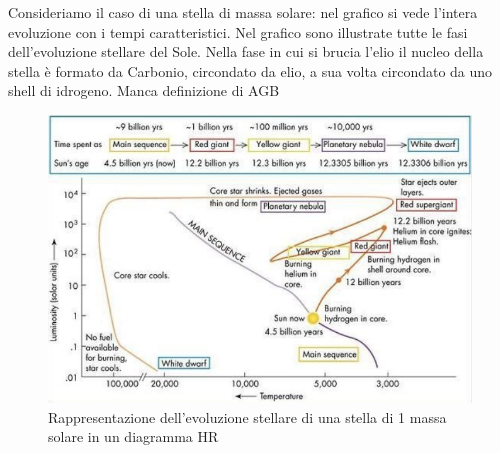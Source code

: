 \documentclass[a4paper,11pt]{article}
\begin{document}
    Consideriamo il caso di una stella di massa solare: nel grafico si vede l'intera evoluzione con i tempi caratteristici. Nel grafico sono illustrate tutte le fasi dell'evoluzione stellare del Sole. Nella fase in cui si brucia l'elio il nucleo della stella è formato da Carbonio, circondato da elio, a sua volta circondato da uno shell di idrogeno. Manca definizione di AGB 

\begin{figure}[h!!]
        \centering
        \includegraphics[width=15cm]{Evoluzione del sole.png}
        \caption{Rappresentazione dell'evoluzione stellare di una stella di 1 massa solare in un diagramma HR}
        \label{fig:Evoluzione del sole.png}
    \end{figure}
\end{document}

